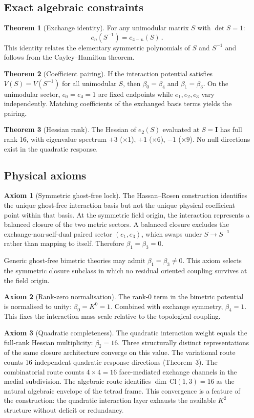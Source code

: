 \documentclass[twocolumn,showpacs,preprintnumbers,amsmath,amssymb,prd]{revtex4-2}
\begin{document}
\subsection{Exact algebraic constraints}

\textbf{Theorem 1} (Exchange identity). For any unimodular matrix $S$ with $\det S = 1$:
\begin{equation}
e_n(S^{-1}) = e_{4-n}(S)\,.
\end{equation}
This identity relates the elementary symmetric polynomials of $S$ and $S^{-1}$ and follows from the Cayley--Hamilton theorem.

\textbf{Theorem 2} (Coefficient pairing). If the interaction potential satisfies $V(S) = V(S^{-1})$ for all unimodular $S$, then $\beta_0 = \beta_4$ and $\beta_1 = \beta_3$. On the unimodular sector, $e_0 = e_4 = 1$ are fixed endpoints while $e_1, e_2, e_3$ vary independently. Matching coefficients of the exchanged basis terms yields the pairing.

\textbf{Theorem 3} (Hessian rank). The Hessian of $e_2(S)$ evaluated at $S = \mathbf{I}$ has full rank 16, with eigenvalue spectrum $+3$ ($\times 1$), $+1$ ($\times 6$), $-1$ ($\times 9$). No null directions exist in the quadratic response.

\subsection{Physical axioms}

\textbf{Axiom 1} (Symmetric ghost-free lock). The Hassan--Rosen construction identifies the unique ghost-free interaction basis but not the unique physical coefficient point within that basis. At the symmetric field origin, the interaction represents a balanced closure of the two metric sectors. A balanced closure excludes the exchange-non-self-dual paired sector $(e_1, e_3)$, which swaps under $S \to S^{-1}$ rather than mapping to itself. Therefore $\beta_1 = \beta_3 = 0$.

Generic ghost-free bimetric theories may admit $\beta_1 = \beta_3 \neq 0$. This axiom selects the symmetric closure subclass in which no residual oriented coupling survives at the field origin.

\textbf{Axiom 2} (Rank-zero normalisation). The rank-0 term in the bimetric potential is normalised to unity: $\beta_0 = K^0 = 1$. Combined with exchange symmetry, $\beta_4 = 1$. This fixes the interaction mass scale relative to the topological coupling.

\textbf{Axiom 3} (Quadratic completeness). The quadratic interaction weight equals the full-rank Hessian multiplicity: $\beta_2 = 16$. Three structurally distinct representations of the same closure architecture converge on this value. The variational route counts 16 independent quadratic response directions (Theorem~3). The combinatorial route counts $4 \times 4 = 16$ face-mediated exchange channels in the medial subdivision. The algebraic route identifies $\dim\,\mathrm{Cl}(1,3) = 16$ as the natural algebraic envelope of the tetrad frame. This convergence is a feature of the construction: the quadratic interaction layer exhausts the available $K^2$ structure without deficit or redundancy.
\end{document}
